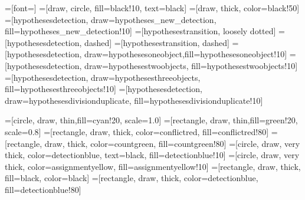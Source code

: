 =[font=\huge]
=[draw, circle, fill=black!10, text=black]
=[draw, thick, color=black!50]
=[hypothesesdetection, draw=hypotheses_new_detection, fill=hypotheses_new_detection!10]%
=[hypothesestransition, loosely dotted]
=[hypothesesdetection, dashed]
=[hypothesestransition, dashed]
=[hypothesesdetection, draw=hypothesesoneobject,fill=hypothesesoneobject!10]
=[hypothesesdetection, draw=hypothesestwoobjects, fill=hypothesestwoobjects!10]
=[hypothesesdetection, draw=hypothesesthreeobjects, fill=hypothesesthreeobjects!10]
=[hypothesesdetection, draw=hypothesesdivisionduplicate, fill=hypothesesdivisionduplicate!10]





=[circle, draw, thin,fill=cyan!20, scale=1.0]
=[rectangle, draw, thin,fill=green!20, scale=0.8]
=[rectangle, draw, thick, color=conflictred, fill=conflictred!80]
=[rectangle, draw, thick, color=countgreen, fill=countgreen!80]
=[circle, draw, very thick, color=detectionblue, text=black, fill=detectionblue!10]
=[circle, draw, very thick, color=assignmentyellow, fill=assignmentyellow!10]
=[rectangle, draw, thick, fill=black, color=black]
=[rectangle, draw, thick, color=detectionblue, fill=detectionblue!80]


